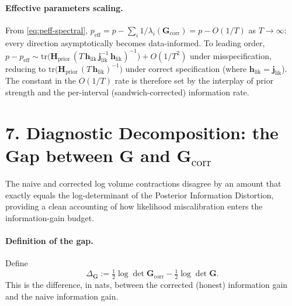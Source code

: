 \documentclass[11pt]{article}
\begin{document}
\paragraph{Effective parameters scaling.}
From \eqref{eq:peff-spectral}, $p_{\mathrm{eff}} = p - \sum_i 1/\lambda_i(\mathbf G_{\mathrm{corr}}) = p - O(1/T)$ as $T \to \infty$: every direction asymptotically becomes data-informed. To leading order, $p - p_{\mathrm{eff}} \sim \mathrm{tr}\bigl(\mathbf H_{\mathrm{prior}}\,(T\, \mathbf h_{\mathrm{lik}}\, \mathbf j_{\mathrm{lik}}^{-1}\, \mathbf h_{\mathrm{lik}})^{-1}\bigr) + O(1/T^2)$ under misspecification, reducing to $\mathrm{tr}\bigl(\mathbf H_{\mathrm{prior}}\,(T\, \mathbf h_{\mathrm{lik}})^{-1}\bigr)$ under correct specification (where $\mathbf h_{\mathrm{lik}} = \mathbf j_{\mathrm{lik}}$). The constant in the $O(1/T)$ rate is therefore set by the interplay of prior strength and the per-interval (sandwich-corrected) information rate.

\section*{7. Diagnostic Decomposition: the Gap between $\mathbf G$ and $\mathbf G_{\mathrm{corr}}$}

The naive and corrected log volume contractions disagree by an amount that exactly equals the log-determinant of the Posterior Information Distortion, providing a clean accounting of how likelihood miscalibration enters the information-gain budget.

\paragraph{Definition of the gap.}
Define
\begin{equation}
\Delta_{\mathbf G}
:=
\tfrac{1}{2} \log \det \mathbf G_{\mathrm{corr}}
- \tfrac{1}{2} \log \det \mathbf G.
\label{eq:DeltaG-def}
\end{equation}
This is the difference, in nats, between the corrected (honest) information gain and the naive information gain.
\end{document}
